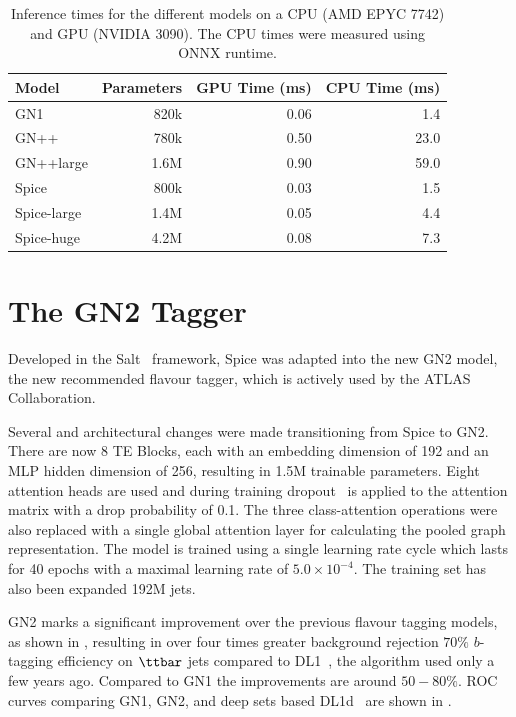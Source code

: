 \begin{table}[h!]
    \centering
    \begin{tabular}{lrrr}
        \toprule
        Model & Parameters & GPU Time (ms) & CPU Time (ms) \\
        \midrule
        GN1 & 820k & 0.06 & 1.4 \\
        GN++ & 780k & 0.50 & 23.0 \\
        GN++large & 1.6M & 0.90 & 59.0 \\
        Spice & 800k & 0.03 & 1.5 \\
        Spice-large & 1.4M & 0.05 & 4.4 \\
        Spice-huge & 4.2M & 0.08 & 7.3 \\
        \bottomrule
    \end{tabular}
    \caption{Inference times for the different models on a CPU (AMD EPYC 7742) and GPU (NVIDIA 3090). The CPU times were measured using ONNX runtime.}
    \label{tab:inference}
\end{table}

\FloatBarrier

\section{The GN2 Tagger}

Developed in the Salt~\cite{Salt} framework, Spice was adapted into the new GN2 model, the new recommended flavour tagger, which is actively used by the ATLAS Collaboration.

Several and architectural changes were made transitioning from Spice to GN2.
There are now 8 TE Blocks, each with an embedding dimension of 192 and an MLP hidden dimension of 256, resulting in 1.5M trainable parameters.
Eight attention heads are used and during training dropout~\cite{Dropout} is applied to the attention matrix with a drop probability of 0.1.
The three class-attention operations were also replaced with a single global attention layer for calculating the pooled graph representation.
The model is trained using a single learning rate cycle which lasts for 40 epochs with a maximal learning rate of $5.0 \times 10^{-4}$.
The training set has also been expanded 192M jets.

GN2 marks a significant improvement over the previous flavour tagging models, as shown in , resulting in over four times greater background rejection $70\%$ $b$-tagging efficiency on $\ttbar$ jets compared to DL1~\cite{DL1}, the algorithm used only a few years ago.
Compared to GN1 the improvements are around $50-80\%$.
ROC curves comparing GN1, GN2, and deep sets based DL1d~\cite{DL1D}  are shown in .

